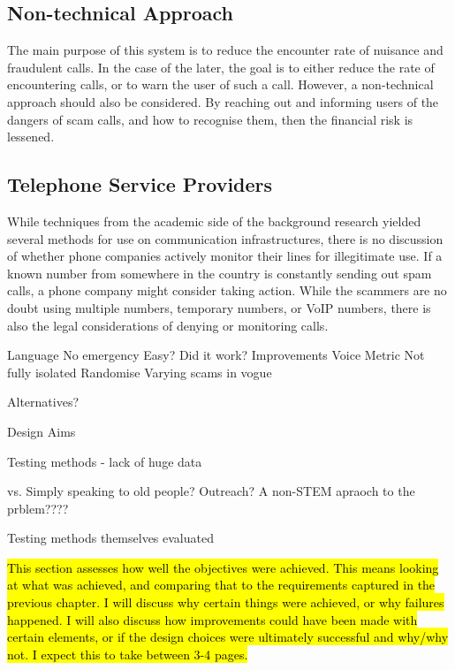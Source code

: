 \documentclass[main.tex]{subfiles}
\begin{document}
\subsection{Non-technical Approach}
The main purpose of this system is to reduce the encounter rate of nuisance and fraudulent calls. In the case of the later, the goal is to either reduce the rate of encountering calls, or to warn the user of such a call. However, a non-technical approach should also be considered. By reaching out and informing users of the dangers of scam calls, and how to recognise them, then the financial risk is lessened.

\subsection{Telephone Service Providers}
While techniques from the academic side of the background research yielded several methods for use on communication infrastructures, there is no discussion of whether phone companies actively monitor their lines for illegitimate use. If a known number from somewhere in the country is constantly sending out spam calls, a phone company might consider taking action. While the scammers are no doubt using multiple numbers, temporary numbers, or VoIP numbers, there is also the legal considerations of denying or monitoring calls.

Language
No emergency
Easy?
Did it work?
Improvements
Voice Metric
Not fully isolated
Randomise
Varying scams in vogue

Alternatives?

Design Aims

Testing methods - lack of huge data

vs. Simply speaking to old people? Outreach? A non-STEM apraoch to the prblem????


Testing methods themselves evaluated

\hl{This section assesses how well the objectives were achieved. This means looking at what was achieved, and comparing that to the requirements captured in the previous chapter. I will discuss why certain things were achieved, or why failures happened. I will also discuss how improvements could have been made with certain elements, or if the design choices were ultimately successful and why/why not. I expect this to take between 3-4 pages.}
\end{document}
